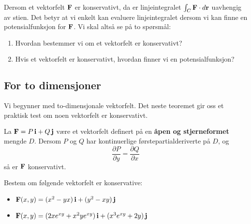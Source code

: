 Dersom et vektorfelt \( \mathbf{F} \) er konservativt, da er linjeintegralet \( \int_C \mathbf{F} \cdot d\mathbf{r} \) uavhengig av stien. 
Det betyr at vi enkelt kan evaluere linjeintegralet dersom vi kan finne en potensialfunksjon for \( \mathbf{F} \). 
Vi skal altså se på to spørsmål:
\begin{enumerate}
    \item Hvordan bestemmer vi om et vektorfelt er konservativt?
    \item Hvis et vektorfelt er konservativt, hvordan finner vi en potensialfunksjon?
\end{enumerate}

%
\subsection*{For to dimensjoner}
Vi begynner med to-dimensjonale vektorfelt. 
Det neste teoremet gir oss et praktisk test om noen vektorfelt er konservativt.

\begin{thm}\label{thm:kons_stjern_2D}
La \( \mathbf{F} = P\, \mathbf{i} + Q\, \mathbf{j} \) være et vektorfelt definert på en \textbf{åpen og stjerneformet} mengde \( D \). Dersom \( P \) og \( Q \) har kontinuerlige førstepartialderiverte på \( D \), og
\[
\frac{\partial P}{\partial y} = \frac{\partial Q}{\partial x}
\]
så er \( \mathbf{F} \) konservativt.
\end{thm}

\begin{eks}{}
Bestem om følgende vektorfelt er konservative:
\begin{itemize}
    \item[(a)] \( \mathbf{F}(x, y) = (x^2 - yx)\, \mathbf{i} + (y^2 - xy)\, \mathbf{j} \)
    \item[(b)] \( \mathbf{F}(x, y) = (2xe^{xy} + x^2 y e^{xy})\, \mathbf{i} + (x^3 e^{xy} + 2y)\, \mathbf{j} \)
\end{itemize}
\end{eks}

